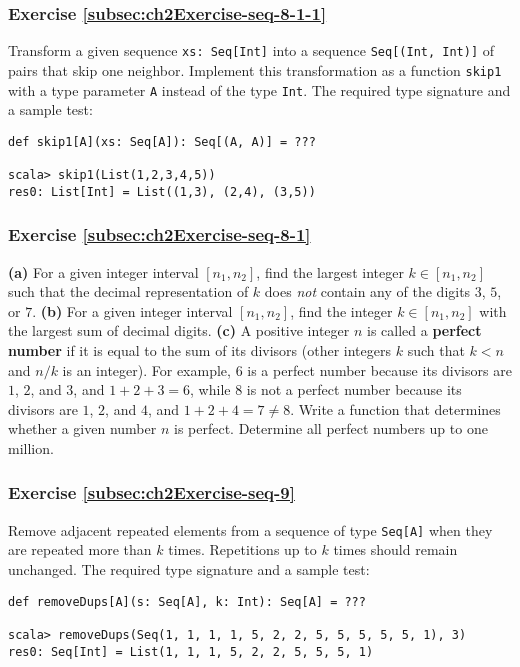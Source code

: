 \subsubsection{Exercise \label{subsec:ch2Exercise-seq-8-1-1}\ref{subsec:ch2Exercise-seq-8-1-1}}

Transform a given sequence \lstinline!xs: Seq[Int]! into a sequence
\lstinline!Seq[(Int, Int)]! of pairs that skip one neighbor. Implement
this transformation as a function \lstinline!skip1! with a type parameter
\lstinline!A! instead of the type \lstinline!Int!. The required
type signature and a sample test:
\begin{lstlisting}
def skip1[A](xs: Seq[A]): Seq[(A, A)] = ???

scala> skip1(List(1,2,3,4,5))
res0: List[Int] = List((1,3), (2,4), (3,5))
\end{lstlisting}


\subsubsection{Exercise \label{subsec:ch2Exercise-seq-8-1}\ref{subsec:ch2Exercise-seq-8-1}}

\textbf{(a)} For a given integer interval $\left[n_{1},n_{2}\right]$,
find the largest integer $k\in\left[n_{1},n_{2}\right]$ such that
the decimal representation of $k$ does \emph{not} contain any of
the digits $3$, $5$, or $7$. \textbf{(b)} For a given integer interval
$\left[n_{1},n_{2}\right]$, find the integer $k\in\left[n_{1},n_{2}\right]$
with the largest sum of decimal digits. \textbf{(c)} A positive integer
$n$ is called a \textbf{perfect number} if
it is equal to the sum of its divisors (other integers $k$ such that
$k<n$ and $n/k$ is an integer). For example, $6$ is a perfect number
because its divisors are $1$, $2$, and $3$, and $1+2+3=6$, while
$8$ is not a perfect number because its divisors are $1$, $2$,
and $4$, and $1+2+4=7\neq8$. Write a function that determines whether
a given number $n$ is perfect. Determine all perfect numbers up to
one million.

\subsubsection{Exercise \label{subsec:ch2Exercise-seq-9}\ref{subsec:ch2Exercise-seq-9}}

Remove adjacent repeated elements from a sequence of type \lstinline!Seq[A]!
when they are repeated more than $k$ times. Repetitions up to $k$
times should remain unchanged. The required type signature and a sample
test:
\begin{lstlisting}
def removeDups[A](s: Seq[A], k: Int): Seq[A] = ???

scala> removeDups(Seq(1, 1, 1, 1, 5, 2, 2, 5, 5, 5, 5, 5, 1), 3)
res0: Seq[Int] = List(1, 1, 1, 5, 2, 2, 5, 5, 5, 1)
\end{lstlisting}


